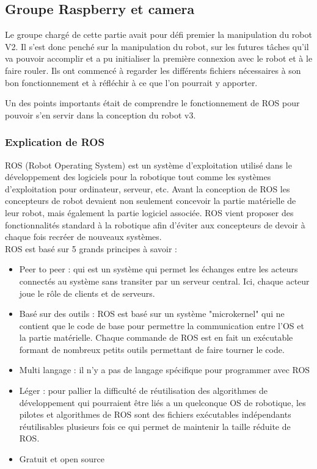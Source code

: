 \subsection{Groupe Raspberry et camera}

Le groupe chargé de cette partie avait pour défi premier la manipulation du robot V2. Il s'est donc penché sur la manipulation du robot, sur les futures tâches qu'il va pouvoir accomplir et a pu initialiser la première connexion avec le robot et à le faire rouler.
Ils ont commencé à regarder les différents fichiers nécessaires à son bon fonctionnement et à réfléchir à ce que l'on pourrait y apporter.\\


Un des points importants était de comprendre le fonctionnement de ROS pour pouvoir s'en servir dans la conception du robot v3.

\subsubsection{Explication de ROS}

ROS (Robot Operating System) est un système d’exploitation utilisé dans le développement des logiciels pour la robotique tout comme les systèmes d’exploitation pour ordinateur, serveur, etc.
Avant la conception de ROS les concepteurs de robot devaient non seulement concevoir la partie matérielle de leur robot, mais également la partie logiciel associée. ROS vient proposer des fonctionnalités standard à la robotique afin d’éviter aux concepteurs de devoir à chaque fois recréer de nouveaux systèmes.\\

ROS est basé sur 5 grands principes à savoir :
\begin{itemize}
\item 	Peer to peer : qui est un système qui permet les échanges entre les acteurs connectés au système sans transiter par un serveur central. Ici, chaque acteur joue le rôle de clients et de serveurs.
\item 	Basé sur des outils : ROS est basé sur un système "microkernel" qui ne contient que le code de base pour permettre la communication entre l’OS et la partie matérielle. Chaque commande de ROS est en fait un exécutable formant de nombreux petits outils permettant de faire tourner le code.
\item 	Multi langage : il n’y a pas de langage spécifique pour programmer avec ROS
\item 	Léger : pour pallier la difficulté de réutilisation des algorithmes de développement qui pourraient être liés a un quelconque OS de robotique, les pilotes et algorithmes de ROS sont des fichiers exécutables indépendants réutilisables plusieurs fois ce qui permet de maintenir la taille réduite de ROS.
\item 	Gratuit et open source
\end{itemize}

